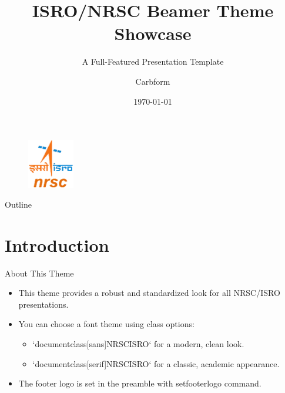 \documentclass[serif]{NRSCISRO}
\title{ISRO/NRSC Beamer Theme Showcase}
\subtitle{A Full-Featured Presentation Template}
\author{Carbform}
\institute{National Remote Sensing Centre, ISRO}
\date{\today}
\begin{document}
\begin{frame}[plain]
    \centering
    \begin{figure}
        \includegraphics[height=2.15cm]{images/nrsc_small.png}
    \end{figure}
    \vfill 
    \maketitle
\end{frame}


\begin{frame}{Outline}
    \begin{multicols}{2}
        \tableofcontents
    \end{multicols}
\end{frame}

\section{Introduction}

\begin{frame}{About This Theme}
    \begin{itemize}
        \item This theme provides a robust and standardized look for all NRSC/ISRO presentations.
        \item You can choose a font theme using class options:
        \begin{itemize}
            \item `documentclass[sans]{NRSCISRO}` for a modern, clean look.
            \item `documentclass[serif]{NRSCISRO}` for a classic, academic appearance.
        \end{itemize}
        \item The footer logo is set in the preamble with setfooterlogo command.
    \end{itemize}
\end{frame}
\end{document}
